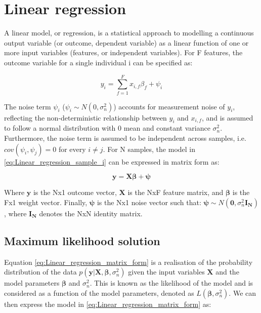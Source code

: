 
\section{Linear regression} 

A linear model, or regression, is a statistical approach to modelling a continuous output variable (or outcome, dependent variable) as a linear function of one or more input variables (features, or independent variables). 
For F features, the outcome variable for a single individual i can be specified as:

\begin{equation} \label{eq:Linear_regression_sample_i}
 y_i = \sum_{f=1}^{F} x_{i,f}\beta_f + \psi_i
\end{equation}

The noise term $\psi_i$ ($ \psi_i \sim N(0, \sigma_n^2)$) accounts for measurement noise of $y_i$, reflecting the non-deterministic relationship between $y_i$ and $x_{i,f}$, and is assumed to follow a normal distribution with 0 mean and constant variance $\sigma_n^2$. 
Furthermore, the noise term is assumed to be independent across samples, i.e. $cov(\psi_i, \psi_j)=0$ for every $i \neq j$. 
For N samples, the model in \eqref{eq:Linear_regression_sample_i} can be expressed in matrix form as:

\begin{equation} \label{eq:Linear_regression_matrix_form}
\mathbf{y} = \mathbf{X}\boldsymbol{\beta} + \boldsymbol{\psi} 
\end{equation}

Where $\mathbf{y}$ is the Nx1 outcome vector, $\mathbf{X}$ is the NxF feature matrix, and $\boldsymbol{\beta}$ is the Fx1 weight vector. 
Finally, $\boldsymbol{\psi}$ is the Nx1 noise vector such that: $\boldsymbol{\psi}\sim N(\mathbf{0}, \sigma_n^2 \mathbf{I_N})$, where $\mathbf{I_N}$ denotes the NxN identity matrix. \\ 


\subsection{Maximum likelihood solution}

Equation \eqref{eq:Linear_regression_matrix_form} is a realisation of the probability distribution of the data $p(\mathbf{y}| \mathbf{X}, \boldsymbol{\beta}, \sigma_n^2)$ given the input variables $\mathbf{X}$ and the model parameters $\boldsymbol{\beta}$ and $\sigma_n^2$.
This is known as the likelihood of the model and is considered as a function of the model parameters, denoted as $L(\boldsymbol{\beta}, \sigma_n^2)$. 
We can then express the model in \eqref{eq:Linear_regression_matrix_form} as:

